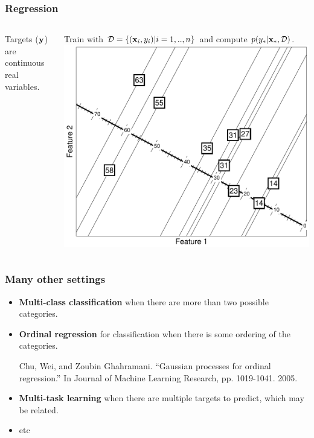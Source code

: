 \begin{frame}
\frametitle{Regression}
\begin{columns}
Targets (${\bf y}$) are continuous real variables.\par
Train with $\mathcal{D} = \{({\bf x}_i,y_i) | i=1,..,n\}$ and compute $p(y_* | {\bf x}_*, \mathcal{D})$.
\includegraphics[width=\textwidth]{regression}
\end{columns}
\end{frame}

\begin{frame}
\frametitle{Many other settings}
\begin{itemize}
\item {\bf Multi-class classification} when there are more than two possible categories.
\item {\bf Ordinal regression} for classification when there is some ordering of the categories.\par
\begin{tiny}
Chu, Wei, and Zoubin Ghahramani. ``Gaussian processes for ordinal regression.'' In Journal of Machine Learning Research, pp. 1019-1041. 2005.\par
\end{tiny}
\item {\bf Multi-task learning} when there are multiple targets to predict, which may be related.
\item etc
\end{itemize}
\end{frame}

